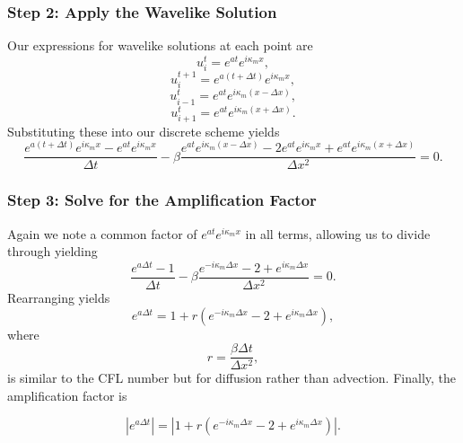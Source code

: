 \subsubsection{Step 2: Apply the Wavelike Solution}
Our expressions for wavelike solutions at each point are
\begin{equation}
	u_{i}^t = e^{at} e^{i \kappa_m x},
\end{equation}
\begin{equation}
	u_{i}^{t+1} = e^{a(t + \Delta t)} e^{i \kappa_m x},
\end{equation}
\begin{equation}
	u_{i-1}^{t} = e^{at} e^{i \kappa_m (x - \Delta x)},
\end{equation}
\begin{equation}
	u_{i+1}^{t} = e^{at} e^{i \kappa_m (x + \Delta x)}.
\end{equation}
Substituting these into our discrete scheme yields
\begin{equation}
  \frac{e^{a(t + \Delta t)} e^{i \kappa_m x} - e^{at} e^{i \kappa_m x}}{\Delta t} -  \beta \frac{e^{at} e^{i \kappa_m (x - \Delta x)} - 2e^{at} e^{i \kappa_m x} + e^{at} e^{i \kappa_m (x + \Delta x)}}{\Delta x ^2} = 0.
\end{equation}

\subsubsection{Step 3: Solve for the Amplification Factor}
Again we note a common factor of $e^{at} e^{i \kappa_m x}$ in all terms, allowing us to divide through yielding
\begin{equation}
  \frac{e^{a\Delta t} - 1}{\Delta t} -  \beta \frac{e^{-i \kappa_m \Delta x} - 2 + e^{i \kappa_m \Delta x}}{\Delta x ^2} = 0.
\end{equation}
Rearranging yields
\begin{equation}
	e^{a\Delta t} = 1 + r \left( e^{-i \kappa_m \Delta x} - 2 + e^{i \kappa_m \Delta x} \right), 
\end{equation}
where
\begin{equation}
	r = \frac{\beta \Delta t}{\Delta x^2},
\end{equation}
is similar to the CFL number but for diffusion rather than advection. Finally, the amplification factor is
\begin{eqBox}
\begin{equation}
	|e^{a\Delta t}| = \left| 1 + r \left( e^{-i \kappa_m \Delta x} - 2 + e^{i \kappa_m \Delta x} \right) \right|.
\end{equation}
\end{eqBox}

